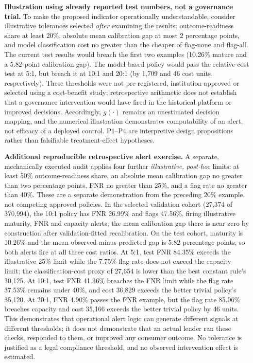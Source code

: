 \documentclass[10pt]{article}
\begin{document}
\noindent\textbf{Illustration using already reported test numbers, not a governance trial.} To make the proposed indicator operationally understandable, consider illustrative tolerances selected \emph{after} examining the results: outcome-readiness share at least 20\%, absolute mean calibration gap at most 2 percentage points, and model classification cost no greater than the cheaper of flag-none and flag-all. The current test results would breach the first two examples (10.26\% mature and a 5.82-point calibration gap). The model-based policy would pass the relative-cost test at 5:1, but breach it at 10:1 and 20:1 (by 1,709 and 46 cost units, respectively). These thresholds were not pre-registered, institution-approved or selected using a cost-benefit study; retrospective arithmetic does not establish that a governance intervention would have fired in the historical platform or improved decisions. Accordingly, $g(\cdot)$ remains an unestimated decision mapping, and the numerical illustration demonstrates computability of an alert, not efficacy of a deployed control. P1--P4 are interpretive design propositions rather than falsifiable treatment-effect hypotheses.

\noindent\textbf{Additional reproducible retrospective alert exercise.} A separate, mechanically executed audit applies four further \emph{illustrative, post-hoc} limits: at least 50\% outcome-readiness share, an absolute mean calibration gap no greater than two percentage points, FNR no greater than 25\%, and a flag rate no greater than 40\%. These are a separate demonstration from the preceding 20\% example, not competing approved policies. In the selected validation cohort (27,374 of 370,994), the 10:1 policy has FNR 26.99\% and flags 47.56\%, firing illustrative maturity, FNR and capacity alerts; the mean calibration gap there is near zero by construction after validation-fitted recalibration. On the test cohort, maturity is 10.26\% and the mean observed-minus-predicted gap is 5.82 percentage points, so both alerts fire at all three cost ratios. At 5:1, test FNR 84.35\% exceeds the illustrative 25\% limit while the 7.75\% flag rate does not exceed the capacity limit; the classification-cost proxy of 27,654 is lower than the best constant rule's 30,125. At 10:1, test FNR 41.36\% breaches the FNR limit while the flag rate 37.53\% remains under 40\%, and cost 36,829 exceeds the better trivial policy's 35,120. At 20:1, FNR 4.90\% passes the FNR example, but the flag rate 85.06\% breaches capacity and cost 35,166 exceeds the better trivial policy by 46 units. This demonstrates that operational alert logic can generate different signals at different thresholds; it does not demonstrate that an actual lender ran these checks, responded to them, or improved any consumer outcome. No tolerance is justified as a legal compliance threshold, and no observed intervention effect is estimated.
\end{document}
